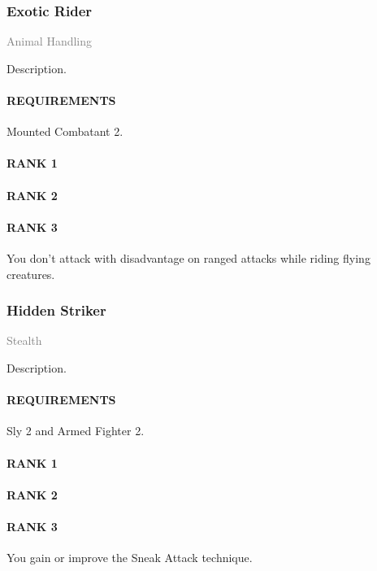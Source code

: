 \subsubsection{Exotic Rider} \label{feat::exoticrider} %
\small{\textcolor{gray}{Animal Handling}}

\normalsize
Description.
\paragraph{REQUIREMENTS} Mounted Combatant 2.
\paragraph{RANK 1}
\paragraph{RANK 2}
\paragraph{RANK 3} You don't attack with disadvantage on ranged attacks while riding flying creatures.

\subsubsection{Hidden Striker} \label{feat::hiddenstriker} %
\small{\textcolor{gray}{Stealth}}

\normalsize
Description.
\paragraph{REQUIREMENTS} Sly 2 and Armed Fighter 2.
\paragraph{RANK 1}
\paragraph{RANK 2}
\paragraph{RANK 3} You gain or improve the Sneak Attack technique.

